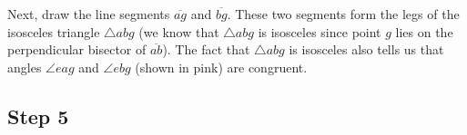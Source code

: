 \documentclass[11pt]{article}
\begin{document}
\vspace{.5cm}

Next, draw the line segments $\overline{ag}$ and $\overline{bg}$. These two segments form the legs of the isosceles triangle $\triangle abg$ (we know that $\triangle abg$ is isosceles since point $g$ lies on the perpendicular bisector of $\overline{ab}$). The fact that $\triangle abg$ is isosceles also tells us that angles $\angle eag$ and $\angle ebg$ (shown in pink) are congruent.

\newpage


\subsection{Step 5}

\vspace{.5cm}
\end{document}

